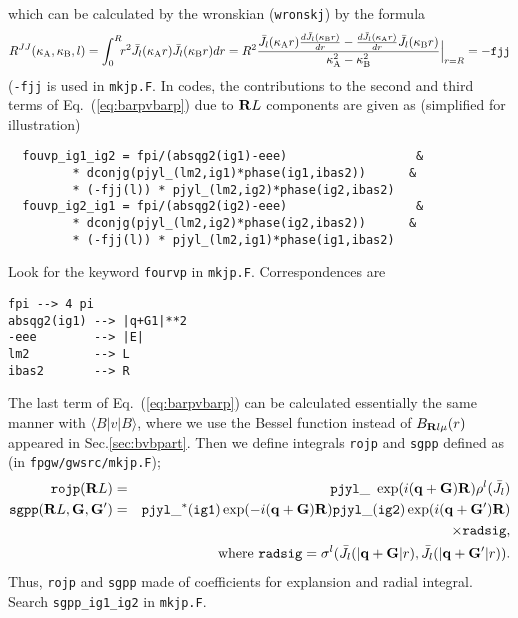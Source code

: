 \documentclass[a4paper,10pt,epsf,fleqn]{article}
\newcommand{\bfq}{{\bf q}}
\newcommand{\bfG}{{\bf G}}
\newcommand{\bfR}{{\bf R}}
\newcommand{\req}[1]{\mbox{Eq.~(\ref{#1})}}
\begin{document}
which can be calculated by the wronskian ({\tt wronskj}) by the formula
\begin{eqnarray}
R^{JJ}(\kappa_{\rm A},\kappa_{\rm B},l)=
\int_0^R \!\!r^2 \bar{J}_l(\kappa_{\rm A} r)
\bar{J}_l(\kappa_{\rm B} r) dr
=R^2\frac{
\bar{J}_l(\kappa_{\rm A} r) \frac{d \bar{J}_l(\kappa_{\rm B} r)}{dr}
-\frac{d \bar{J}_l(\kappa_{\rm A} r)}{dr}\bar{J}_l(\kappa_{\rm B} r)
}{\kappa_{\rm A}^2-\kappa_{\rm B}^2}\Big|_{r=R}= {\tt -fjj}
\end{eqnarray}
({\tt -fjj} is used in {\tt mkjp.F}.
In codes, the contributions to the second and third terms of \req{eq:barpvbarp} due to $\bfR{L}$ components are given as (simplified for illustration) 
\begin{verbatim}
  fouvp_ig1_ig2 = fpi/(absqg2(ig1)-eee)                  &
         * dconjg(pjyl_(lm2,ig1)*phase(ig1,ibas2))      &  
         * (-fjj(l)) * pjyl_(lm2,ig2)*phase(ig2,ibas2)
  fouvp_ig2_ig1 = fpi/(absqg2(ig2)-eee)                  & 
         * dconjg(pjyl_(lm2,ig2)*phase(ig2,ibas2))      &
         * (-fjj(l)) * pjyl_(lm2,ig1)*phase(ig1,ibas2)
\end{verbatim}
Look for the keyword \verb!fourvp! in \verb!mkjp.F!.
Correspondences are
\begin{verbatim}
fpi --> 4 pi
absqg2(ig1) --> |q+G1|**2
-eee        --> |E|
lm2         --> L
ibas2       --> R
\end{verbatim}

The last term of \req{eq:barpvbarp} can be calculated essentially
the same manner with $\langle B| v| B\rangle$, where we use the
Bessel function instead of $B_{\bfR{l}\mu}(r)$ appeared in Sec.\ref{sec:bvbpart}.
Then we define integrals 
{\tt rojp} and {\tt sgpp} defined as (in {\tt fpgw/gwsrc/mkjp.F});
\begin{eqnarray}
{\tt rojp}(\bfR L)&=&{\tt pjyl\_} \ 
\exp(i (\bfq+\bfG) \bfR)  \rho^l(\bar{J}_l) \\
{\tt sgpp}(\bfR L,\bfG,\bfG')&=&{\tt pjyl\_^*(ig1)} \exp(-i (\bfq+\bfG) \bfR)
{\tt pjyl\_(ig2)} \exp(i (\bfq+\bfG') \bfR) 
\nonumber \\
&&  \times {\tt  radsig}, \nonumber \\
&& \ {\rm where\ }
{\tt radsig}=\sigma^l(\bar{J}_l(|\bfq+\bfG|r),\bar{J}_l(|\bfq+\bfG'|r)).
\end{eqnarray} 
Thus, {\tt rojp} and {\tt sgpp} made of coefficients for explansion
and radial integral.
Search {\tt sgpp\_ig1\_ig2} in {\tt mkjp.F}. 
\end{document}
